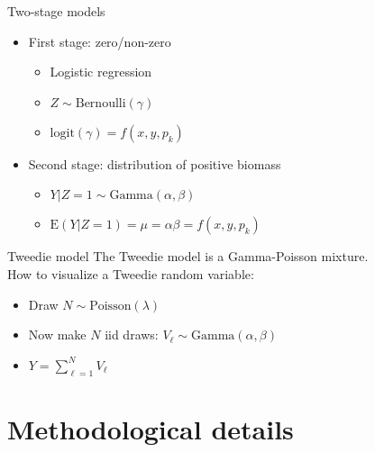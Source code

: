 \documentclass{beamer}
\begin{document}
\begin{frame}[fragile]{Two-stage models}
  \begin{itemize}
    \item First stage: zero/non-zero
    \begin{itemize}
      \item Logistic regression
      \item $Z \sim \text{Bernoulli}(\gamma)$
      \item $\text{logit}(\gamma) = f(x,y,p_k)$
    \end{itemize}
    \item Second stage: distribution of positive biomass
    \begin{itemize}
      \item $Y|Z=1 \sim \text{Gamma}(\alpha, \beta)$
      \item $\text{E}\left(Y|Z=1\right) = \mu = \alpha \beta = f(x,y,p_k)$
    \end{itemize}
  \end{itemize}
\end{frame}


\begin{frame}[fragile]{Tweedie model}
  The Tweedie model is a Gamma-Poisson mixture.\\
  How to visualize a Tweedie random variable:
  \begin{itemize}
    \item Draw $N \sim \text{Poisson}(\lambda)$
    \item Now make $N$ iid draws: $V_{\ell} \sim \text{Gamma}(\alpha, \beta)$
    \item $Y = \sum\limits_{\ell=1}^N  V_{\ell}$
  \end{itemize}
\end{frame}


\section{Methodological details}
\subsection{}


\begin{frame}{}

\end{frame}
\end{document}
